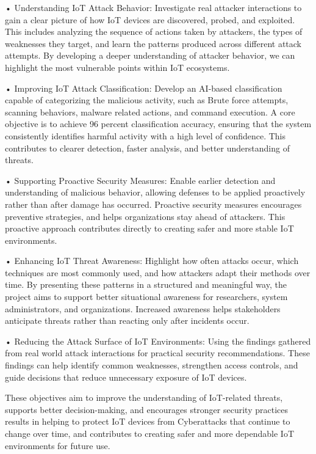     • Understanding IoT Attack Behavior: Investigate real attacker interactions to gain a clear picture of how IoT devices are discovered, probed, and exploited. This includes analyzing the sequence of actions taken by attackers, the types of weaknesses they target, and learn the patterns produced across different attack attempts. By developing a deeper understanding of attacker behavior, we can highlight the most vulnerable points within IoT ecosystems.

    • Improving IoT Attack Classification: Develop an AI-based classification capable of categorizing the malicious activity, such as Brute force attempts, scanning behaviors, malware related actions, and command execution. A core objective is to achieve 96 percent classification accuracy, ensuring that the system consistently identifies harmful activity with a high level of confidence. This contributes to clearer detection, faster analysis, and better understanding of threats.

    • Supporting Proactive Security Measures: Enable earlier detection and understanding of malicious behavior, allowing defenses to be applied proactively rather than after damage has occurred. Proactive security measures encourages preventive strategies, and helps organizations stay ahead of attackers. This proactive approach contributes directly to creating safer and more stable IoT environments.

    • Enhancing IoT Threat Awareness: Highlight how often attacks occur, which techniques are most commonly used, and how attackers adapt their methods over time. By presenting these patterns in a structured and meaningful way, the project aims to support better situational awareness for researchers, system administrators, and organizations. Increased awareness helps stakeholders anticipate threats rather than reacting only after incidents occur.

    • Reducing the Attack Surface of IoT Environments: Using the findings gathered from real world attack interactions for practical security recommendations. These findings can help identify common weaknesses, strengthen access controls, and guide decisions that reduce unnecessary exposure of IoT devices.

These objectives aim to improve the understanding of IoT-related threats, supports better decision-making, and encourages stronger security practices results in  helping to protect IoT devices from Cyberattacks that continue to change over time, and contributes to creating safer and more dependable IoT environments for future use.
